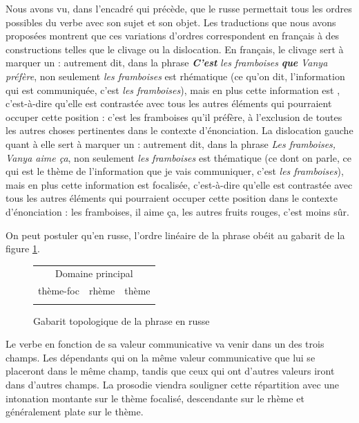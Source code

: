 {    Nous avons vu, dans l’encadré qui précède, que le russe permettait tous les ordres possibles du verbe avec son sujet et son objet. Les traductions que nous avons proposées montrent que ces variations d’ordres correspondent en français à des constructions telles que le clivage ou la dislocation. En français, le clivage sert à marquer un : autrement dit, dans la phrase \textbf{\textit{C’est}} \textit{les framboises} \textbf{\textit{que}} \textit{Vanya préfère}, non seulement \textit{les framboises} est rhématique (ce qu’on dit, l’information qui est communiquée, c’est \textit{les framboises}), mais en plus cette information est , c’est-à-dire qu’elle est contrastée avec tous les autres éléments qui pourraient occuper cette position : c’est les framboises qu’il préfère, à l’exclusion de toutes les autres choses pertinentes dans le contexte d’énonciation. La dislocation gauche quant à elle sert à marquer un : autrement dit, dans la phrase \textit{Les framboises, Vanya aime ça}, non seulement \textit{les framboises} est thématique (ce dont on parle, ce qui est le thème de l’information que je vais communiquer, c’est \textit{les framboises}), mais en plus cette information est focalisée, c’est-à-dire qu’elle est contrastée avec tous les autres éléments qui pourraient occuper cette position dans le contexte d’énonciation : les framboises, il aime ça, les autres fruits rouges, c’est moins sûr.

    On peut postuler qu’en russe, l’ordre linéaire de la phrase obéit au gabarit de la figure \ref{fig:topo-russe}.

    \begin{figure}[H]
    \caption{Gabarit topologique de la phrase en russe\label{fig:topo-russe}}
    \begin{tabular}{|c|c|c|}
     \hline
    \multicolumn{3}{|c|}{\cellcolor{lsDOIGray}Domaine principal}\\
    \hhline{---}
    thème-foc & rhème & thème\\
    \hhline{---}
    \end{tabular}
    \end{figure}

    Le verbe en fonction de sa valeur communicative va venir dans un des trois champs. Les dépendants qui on la même valeur communicative que lui se placeront dans le même champ, tandis que ceux qui ont d’autres valeurs iront dans d’autres champs. La prosodie viendra souligner cette répartition avec une intonation montante sur le thème focalisé, descendante sur le rhème et généralement plate sur le thème.

}
